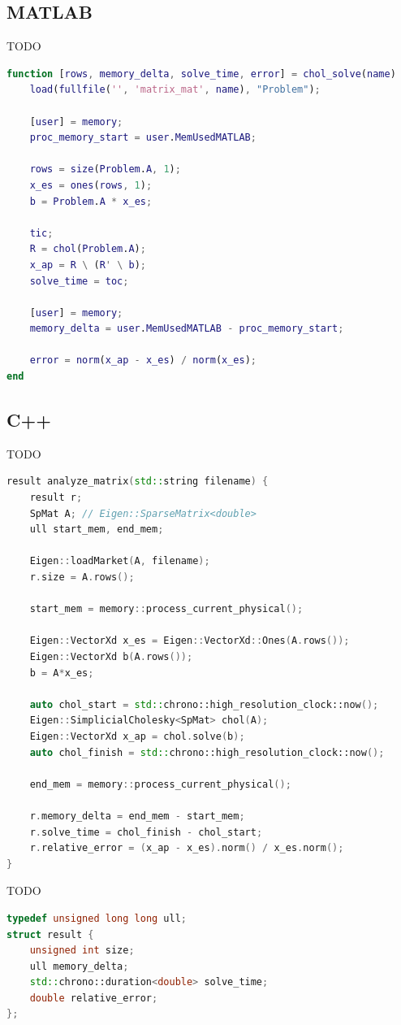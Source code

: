 \documentclass[11pt,italian]{article}
\begin{document}
\subsection{MATLAB}
TODO
\begin{lstlisting}[language=Matlab,emph={ones},caption=MATLAB: Algoritmo principale,label=fig:code-cpp-algo]
function [rows, memory_delta, solve_time, error] = chol_solve(name)
    load(fullfile('', 'matrix_mat', name), "Problem");

    [user] = memory;
    proc_memory_start = user.MemUsedMATLAB;

    rows = size(Problem.A, 1);
    x_es = ones(rows, 1);
    b = Problem.A * x_es;

    tic;
    R = chol(Problem.A);
    x_ap = R \ (R' \ b);
    solve_time = toc;

    [user] = memory;
    memory_delta = user.MemUsedMATLAB - proc_memory_start;

    error = norm(x_ap - x_es) / norm(x_es);
end
\end{lstlisting}

\subsection{C++}
TODO
\begin{lstlisting}[language=C++,emph={result,SpMat,Eigen,int,std},caption=C++: Algoritmo principale,label=fig:code-cpp-algo]
result analyze_matrix(std::string filename) {
    result r;
    SpMat A; // Eigen::SparseMatrix<double>
    ull start_mem, end_mem;

    Eigen::loadMarket(A, filename);
    r.size = A.rows();

    start_mem = memory::process_current_physical();

    Eigen::VectorXd x_es = Eigen::VectorXd::Ones(A.rows());
    Eigen::VectorXd b(A.rows());
    b = A*x_es;

    auto chol_start = std::chrono::high_resolution_clock::now();
    Eigen::SimplicialCholesky<SpMat> chol(A);
    Eigen::VectorXd x_ap = chol.solve(b);
    auto chol_finish = std::chrono::high_resolution_clock::now();

    end_mem = memory::process_current_physical();

    r.memory_delta = end_mem - start_mem;
    r.solve_time = chol_finish - chol_start;
    r.relative_error = (x_ap - x_es).norm() / x_es.norm();
}
\end{lstlisting}

TODO
\begin{lstlisting}[language=C++,emph={ull,std},caption=C++: Struct per la memorizzazione del risultato,label=fig:code-cpp-algo]
typedef unsigned long long ull;
struct result {
    unsigned int size;
    ull memory_delta;
    std::chrono::duration<double> solve_time;
    double relative_error;
};
\end{lstlisting}
\end{document}
